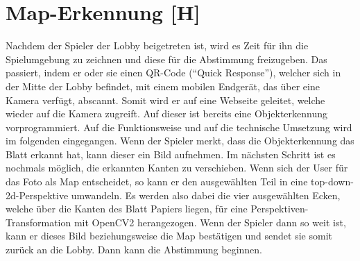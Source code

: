 
\section{Map-Erkennung [H]}\label{maai:maperkennung:head}
Nachdem der Spieler der Lobby beigetreten ist, wird es Zeit für ihn die Spielumgebung zu zeichnen und diese für die
Abstimmung freizugeben. Das passiert, indem er oder sie einen QR-Code (``Quick Response''), welcher sich in der
Mitte der Lobby befindet, mit einem mobilen Endgerät, das über eine Kamera verfügt, abscannt. Somit wird
er auf eine Webseite geleitet, welche wieder auf die Kamera zugreift. Auf dieser ist bereits eine Objekterkennung
vorprogrammiert. Auf die Funktionsweise und auf die technische Umsetzung wird im folgenden eingegangen. Wenn der Spieler
merkt, dass die Objekterkennung das Blatt erkannt hat, kann dieser ein Bild aufnehmen. Im nächsten Schritt ist es nochmals möglich,
die erkannten Kanten zu verschieben. Wenn sich der User für das Foto als Map entscheidet, so kann er den ausgewählten Teil in eine
top-down-2d-Perspektive
umwandeln. Es werden also dabei die vier ausgewählten Ecken, welche über die Kanten des Blatt Papiers liegen,
für eine Perspektiven-Transformation
mit OpenCV2 herangezogen. Wenn der Spieler dann so weit ist, kann er dieses Bild beziehungsweise die Map bestätigen und
sendet sie somit zurück an die Lobby. Dann kann die Abstimmung beginnen.


